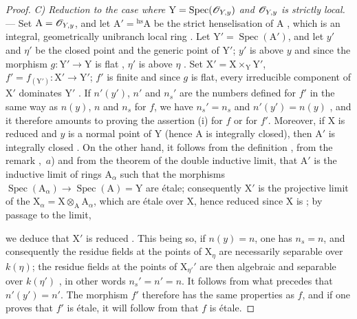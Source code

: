 \begin{proof}
\emph{C) Reduction to the case where $\mathrm{Y}=\operatorname{Spec}(\mathscr{O}_{Y,y})$ and $\mathscr{O}_{Y,y}$ is strictly local.} ---
Set $\mathrm{A}=\mathscr{O}_{Y,y}$, and let $\mathrm{A}'={}^{\mathrm{hs}}\mathrm{A}$ be the strict henselisation of $\mathrm{A}$ , which is an integral, geometrically unibranch local ring .
Let $\mathrm{Y}'=\operatorname{Spec}(\mathrm{A}')$, and let $y'$ and $\eta'$ be the closed point and the generic point of $\mathrm{Y}'$; $y'$ is above $y$ and since the morphism $g:\mathrm{Y}'\to\mathrm{Y}$ is flat , $\eta'$ is above $\eta$ .
Set $\mathrm{X}'=\mathrm{X}\times_{\mathrm{Y}}\mathrm{Y}'$, $f'=f_{(\mathrm{Y}')}:\mathrm{X}'\to\mathrm{Y}'$; $f'$ is finite and since $g$ is flat, every irreducible component of $\mathrm{X}'$ dominates $\mathrm{Y}'$ .
If $n'(y')$, $n'$ and $n_s'$ are the numbers defined for $f'$ in the same way as $n(y)$, $n$ and $n_s$ for $f$, we have $n_s'=n_s$ and $n'(y')=n(y)$ , and it therefore amounts to proving the assertion (i) for $f$ or for $f'$.
Moreover, if $\mathrm{X}$ is reduced and $y$ is a normal point of $\mathrm{Y}$ (hence $\mathrm{A}$ is integrally closed), then $\mathrm{A}'$ is integrally closed .
On the other hand, it follows from the definition , from the remark ,~$a$) and from the theorem of the double inductive limit, that $\mathrm{A}'$ is the inductive limit of rings $\mathrm{A}_\alpha$ such that the morphisms $\operatorname{Spec}(\mathrm{A}_\alpha)\to\operatorname{Spec}(\mathrm{A})=\mathrm{Y}$ are \'etale; consequently $\mathrm{X}'$ is the projective limit of the $\mathrm{X}_\alpha=\mathrm{X}\otimes_{\mathrm{A}}\mathrm{A}_\alpha$, which are \'etale over $\mathrm{X}$, hence reduced since $\mathrm{X}$ is ; by passage to the limit,


we deduce that $\mathrm{X}'$ is reduced .
This being so, if $n(y)=n$, one has $n_s=n$, and consequently the residue fields at the points of $\mathrm{X}_\eta$ are necessarily separable over $k(\eta)$; the residue fields at the points of $\mathrm{X}_{\eta'}'$ are then algebraic and separable over $k(\eta')$ , in other words $n_s'=n'=n$. It follows from what precedes that $n'(y')=n'$.
The morphism $f'$ therefore has the same properties as $f$, and if one proves that $f'$ is \'etale, it will follow from  that $f$ is \'etale.


\end{proof}
